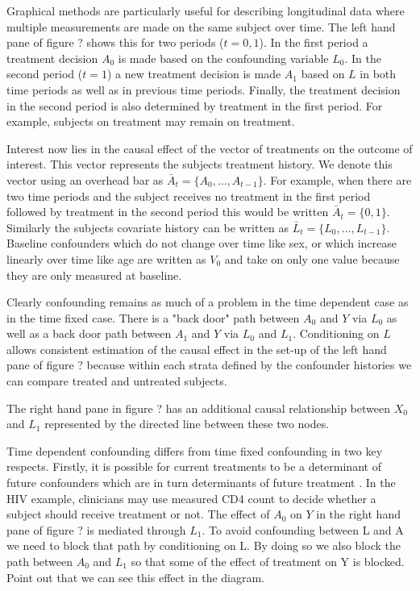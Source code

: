 \documentclass[11pt]{article}
\begin{document}
Graphical methods are particularly useful for describing longitudinal
data where multiple measurements are made on the same subject over time.
The left hand pane of figure ? shows this for two periods
(\(t = 0, 1\)). In the first period a treatment decision \(A_0\) is made
based on the confounding variable \(L_0\). In the second period
(\(t = 1\)) a new treatment decision is made \(A_1\) based on \(L\) in
both time periods as well as in previous time periods. Finally, the
treatment decision in the second period is also determined by treatment
in the first period. For example, subjects on treatment may remain on
treatment. \linebreak 

Interest now lies in the causal effect of the vector of treatments on
the outcome of interest. This vector represents the subjects treatment
history. We denote this vector using an overhead bar as
\(\bar A_{t} = \{A_{0}, \hdots, A_{t-1}\}\). For example, when there are
two time periods and the subject receives no treatment in the first
period followed by treatment in the second period this would be written
\(\bar A_{t} = \{0, 1\}\). Similarly the subjects covariate history can
be written as \(\bar L_{t} = \{L_{0}, \hdots, L_{t-1}\}\). Baseline
confounders which do not change over time like sex, or which increase
linearly over time like age are written as \(V_0\) and take on only one
value because they are only measured at baseline. \linebreak

Clearly confounding remains as much of a problem in the time dependent
case as in the time fixed case. There is a "back door" path between
\(A_0\) and \(Y\) via \(L_0\) as well as a back door path between
\(A_1\) and \(Y\) via \(L_0\) and \(L_1\). Conditioning on \(L\) allows
consistent estimation of the causal effect in the set-up of the left
hand pane of figure ? because within each strata defined by the
confounder histories we can compare treated and untreated subjects.

The right hand pane in figure ? has an additional causal relationship
between \(X_0\) and \(L_1\) represented by the directed line between
these two nodes.

Time dependent confounding differs from time fixed confounding in two
key respects. Firstly, it is possible for current treatments to be a
determinant of future confounders which are in turn determinants of
future treatment \citet{Robins2000a}. In the HIV example, clinicians may
use measured CD4 count to decide whether a subject should receive
treatment or not. The effect of \(A_0\) on \(Y\) in the right hand pane
of figure ? is mediated through \(L_1\). To avoid confounding between L
and A we need to block that path by conditioning on L. By doing so we
also block the path between \(A_0\) and \(L_1\) so that some of the
effect of treatment on Y is blocked. Point out that we can see this
effect in the diagram. \linebreak
\end{document}
